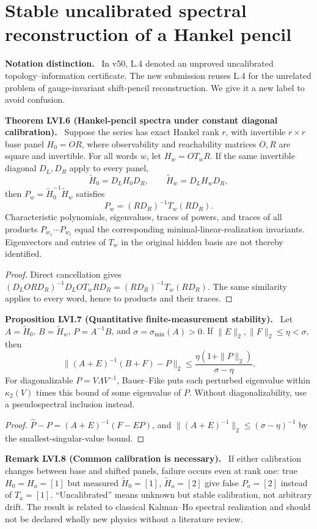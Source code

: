 \documentclass[11pt,a4paper,oneside]{book}
\newcommand{\statement}[3]{\par\medskip\noindent\textbf{#1 #2 (#3).}\ }
\newcommand{\note}[1]{\par\medskip\noindent\textbf{#1}\ }
\begin{document}
\section{Stable uncalibrated spectral reconstruction of a Hankel pencil}
\note{Notation distinction.} In v50, L.4 denoted an unproved uncalibrated topology--information certificate. The new submission reuses L.4 for the unrelated problem of gauge-invariant shift-pencil reconstruction. We give it a new label to avoid confusion.
\statement{Theorem}{LVI.6}{Hankel-pencil spectra under constant diagonal calibration}
Suppose the series has exact Hankel rank $r$, with invertible $r\times r$ base panel $H_0=OR$, where observability and reachability matrices $O,R$ are square and invertible. For all words $w$, let $H_w=OT_wR$. If the same invertible diagonal $D_L,D_R$ apply to every panel,
\[\widetilde H_0=D_LH_0D_R,\qquad\widetilde H_w=D_LH_wD_R,\]
then $P_w=\widetilde H_0^{-1}\widetilde H_w$ satisfies
\begin{equation}P_w=(RD_R)^{-1}T_w(RD_R).\tag{348}\end{equation}
Characteristic polynomials, eigenvalues, traces of powers, and traces of all products $P_{w_1}\cdots P_{w_t}$ equal the corresponding minimal-linear-realization invariants. Eigenvectors and entries of $T_w$ in the original hidden basis are not thereby identified.
\begin{proof}
Direct cancellation gives $(D_LORD_R)^{-1}D_LOT_wRD_R=(RD_R)^{-1}T_w(RD_R)$. The same similarity applies to every word, hence to products and their traces.
\end{proof}
\statement{Proposition}{LVI.7}{Quantitative finite-measurement stability}
Let $A=\widetilde H_0$, $B=\widetilde H_w$, $P=A^{-1}B$, and $\sigma=\sigma_{\min}(A)>0$. If $\|E\|_2,\|F\|_2\le\eta<\sigma$, then
\begin{equation}\|(A+E)^{-1}(B+F)-P\|_2\le\frac{\eta(1+\|P\|_2)}{\sigma-\eta}.\tag{349}\end{equation}
For diagonalizable $P=V\Lambda V^{-1}$, Bauer--Fike puts each perturbed eigenvalue within $\kappa_2(V)$ times this bound of some eigenvalue of $P$. Without diagonalizability, use a pseudospectral inclusion instead.
\begin{proof}
$\widehat P-P=(A+E)^{-1}(F-EP)$, and $\|(A+E)^{-1}\|_2\le(\sigma-\eta)^{-1}$ by the smallest-singular-value bound.
\end{proof}
\statement{Remark}{LVI.8}{Common calibration is necessary}
If either calibration changes between base and shifted panels, failure occurs even at rank one: true $H_0=H_a=[1]$ but measured $\widetilde H_0=[1]$, $\widetilde H_a=[2]$ give false $P_a=[2]$ instead of $T_a=[1]$. ``Uncalibrated'' means unknown but stable calibration, not arbitrary drift. The result is related to classical Kalman--Ho spectral realization and should not be declared wholly new physics without a literature review.
\end{document}
